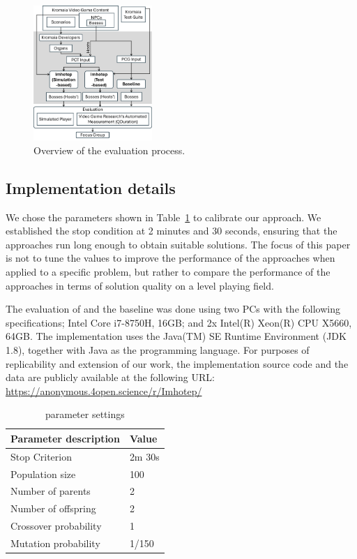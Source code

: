\begin{figure}[h]
    \centering
    \includegraphics[width=0.4\textwidth]{Figures/evaluation_process.png}
    \caption{Overview of the evaluation process.}
    \label{fig:evaluation}
\end{figure}

\subsection{Implementation details}

We chose the parameters shown in Table~\ref{tab:evaluation_parameters} to calibrate our \ApproachName{} approach. We established the stop condition at 2 minutes and 30 seconds, ensuring that the approaches run long enough to obtain suitable solutions. The focus of this paper is not to tune the values to improve the performance of the approaches when applied to a specific problem, but rather to compare the performance of the approaches in terms of solution quality on a level playing field.

The evaluation of \ApproachName{} and the baseline was done
using two PCs with the following specifications; Intel Core i7-8750H, 16GB; and  2x Intel(R) Xeon(R) CPU X5660, 64GB.
The implementation uses the Java(TM) SE Runtime Environment (JDK 1.8), together with Java as the programming language. 
For purposes of replicability and extension of our work, the implementation source code and the data are publicly available at the following URL: \url{https://anonymous.4open.science/r/Imhotep/}

\begin{table}[h]
    \centering
    \begin{tabular}{ll}
        \hline
        \bf{Parameter description}            & \bf{Value}  \\ \hline
        Stop Criterion                   & 2m 30s \\
        Population size                  & 100    \\
        Number of parents                & 2      \\
        Number of offspring              & 2      \\
        Crossover probability            & 1      \\
        Mutation probability             & 1/150 \\ \hline
    \end{tabular}
    \caption{\ApproachName{} parameter settings}
    \label{tab:evaluation_parameters}
    \end{table}

